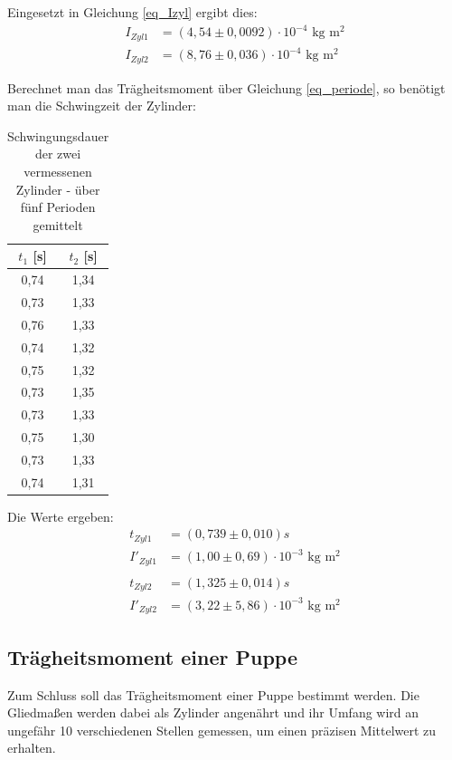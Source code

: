 Eingesetzt in Gleichung \eqref{eq_Izyl} ergibt dies:
\begin{align*}
I_{Zyl 1}&=(4,54\pm0,0092)\cdot10^{-4}\text{ kg m$^2$}\\
I_{Zyl 2}&=(8,76\pm0,036)\cdot10^{-4}\text{ kg m$^2$}
\end{align*}

Berechnet man das Trägheitsmoment über Gleichung \eqref{eq_periode}, so benötigt man die Schwingzeit der Zylinder:
\begin{table}[htbp]
\begin{tabular}{|c|c|}
\hline 
$t_1$ [s] & $t_2$ [s]\\ \hline
0,74&	1,34\\ \hline
0,73&	1,33\\ \hline
0,76&	1,33\\ \hline
0,74&	1,32\\ \hline
0,75&	1,32\\ \hline
0,73&	1,35\\ \hline
0,73&	1,33\\ \hline
0,75&	1,30\\ \hline
0,73&	1,33\\ \hline
0,74&	1,31\\ \hline
\end{tabular} 
\caption{Schwingungsdauer der zwei vermessenen Zylinder - über fünf Perioden \mbox{gemittelt}}
\end{table}

Die Werte ergeben:
\begin{align*}
t_{Zyl 1}&=(0,739 \pm 0,010)s\\
I'_{Zyl 1}&=(1,00\pm0,69)\cdot10^{-3}\text{ kg m$^2$}\\
\end{align*}
\begin{align*}
t_{Zyl 2}&=(1,325 \pm  0,014)s\\ 
I'_{Zyl 2}&=(3,22\pm5,86)\cdot10^{-3}\text{ kg m$^2$}
\end{align*}

\subsection{Trägheitsmoment einer Puppe}
Zum Schluss soll das Trägheitsmoment einer Puppe bestimmt werden. Die Gliedmaßen werden dabei als Zylinder angenährt und ihr Umfang wird an ungefähr 10 verschiedenen Stellen gemessen, um einen präzisen Mittelwert zu erhalten.


